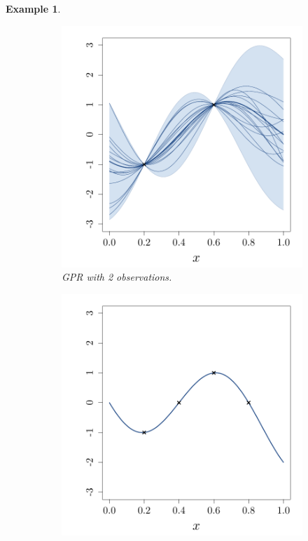 \documentclass[twoside,openright]{report}
\newtheorem{example}{Example}
\begin{document}
\begin{example}
\begin{figure}[ht!]
\begin{subfigure}[t]{0.30\textwidth}
                \includegraphics[width=\textwidth]{figures/ch5_finitedim2}
                \caption{GPR with 2 observations.}
        \end{subfigure}%
        \hspace{0.2cm}       
        \begin{subfigure}[t]{0.30\textwidth}
                \includegraphics[width=\textwidth]{figures/ch5_finitedim4}

\end{subfigure}
\end{figure}
\end{example}
\end{document}
